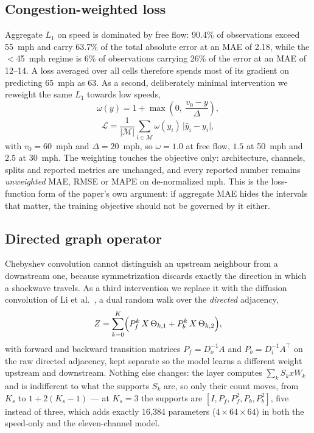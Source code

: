 \documentclass[letterpaper]{article}
\begin{document}
\subsection{Congestion-weighted loss}

Aggregate $L_1$ on speed is dominated by free flow: 90.4\% of observations exceed 55~mph and carry 63.7\% of the total absolute error at an MAE of 2.18, while the $<$45~mph regime is 6\% of observations carrying 26\% of the error at an MAE of 12--14. A loss averaged over all cells therefore spends most of its gradient on predicting 65~mph as 63. As a second, deliberately minimal intervention we reweight the same $L_1$ towards low speeds,
\begin{equation}
\omega(y)=1+\max\!\left(0,\ \frac{v_0-y}{\Delta}\right),
\end{equation}
\begin{equation}
\mathcal{L}=\frac{1}{|\mathcal{M}|}\sum_{i\in\mathcal{M}}\omega(y_i)\,\bigl|\hat y_i-y_i\bigr|,
\end{equation}
with $v_0=60$~mph and $\Delta=20$~mph, so $\omega=1.0$ at free flow, $1.5$ at 50~mph and $2.5$ at 30~mph. The weighting touches the objective only: architecture, channels, splits and reported metrics are unchanged, and every reported number remains \emph{unweighted} MAE, RMSE or MAPE on de-normalized mph. This is the loss-function form of the paper's own argument: if aggregate MAE hides the intervals that matter, the training objective should not be governed by it either.

\subsection{Directed graph operator}

Chebyshev convolution cannot distinguish an upstream neighbour from a downstream one, because symmetrization discards exactly the direction in which a shockwave travels. As a third intervention we replace it with the diffusion convolution of Li et al.~, a dual random walk over the \emph{directed} adjacency,
\begin{equation}
Z=\sum_{k=0}^{K}\Bigl(P_{f}^{k}\,X\,\Theta_{k,1}+P_{b}^{k}\,X\,\Theta_{k,2}\Bigr),
\end{equation}
with forward and backward transition matrices $P_f=D_o^{-1}A$ and $P_b=D_i^{-1}A^{\!\top}$ on the raw directed adjacency, kept separate so the model learns a different weight upstream and downstream. Nothing else changes: the layer computes $\sum_k S_k x W_k$ and is indifferent to what the supports $S_k$ are, so only their count moves, from $K_s$ to $1+2(K_s-1)$ --- at $K_s=3$ the supports are $[I,P_f,P_f^2,P_b,P_b^2]$, five instead of three, which adds exactly 16{,}384 parameters ($4\times64\times64$) in both the speed-only and the eleven-channel model.
\end{document}
